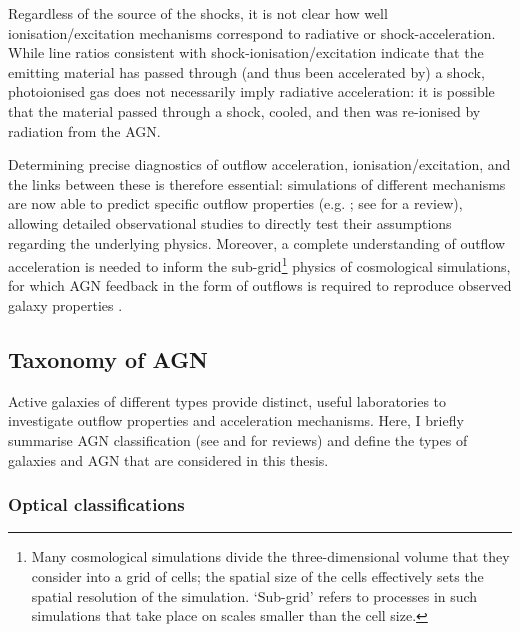 Regardless of the source of the shocks, it is not clear how well ionisation/excitation mechanisms correspond to radiative or shock-acceleration. While line ratios consistent with shock-ionisation/excitation indicate that the emitting material has passed through (and thus been accelerated by) a shock, photoionised gas does not necessarily imply radiative acceleration: it is possible that the material passed through a shock, cooled, and then was re-ionised by radiation from the AGN. 

Determining precise diagnostics of outflow acceleration, ionisation/excitation, and the links between these is therefore essential: simulations of different mechanisms are now able to predict specific outflow properties (e.g. \citealt{Richings2021, Meenakshi2022a, Meenakshi2022b}; see \citealt{Krause2023} for a review), allowing detailed observational studies to directly test their assumptions regarding the underlying physics. Moreover, a complete understanding of outflow acceleration is needed to inform the sub-grid\footnote{Many cosmological simulations divide the three-dimensional volume that they consider into a grid of cells; the spatial size of the cells effectively sets the spatial resolution of the simulation. `Sub-grid' refers to processes in such simulations that take place on scales smaller than the cell size.} physics of cosmological simulations, for which AGN feedback in the form of outflows is required to reproduce observed galaxy properties \citep{Schaye2015, Dubois2016, Dave2019, Zinger2020}.

\subsection{Taxonomy of AGN}
\label{section: introduction: outflows: taxonomy_of_agn}

Active galaxies of different types provide distinct, useful laboratories to investigate outflow properties and acceleration mechanisms. Here, I briefly summarise AGN classification (see \citealt{Netzer2015} and \citealt{Tadhunter2008, Tadhunter2016} for reviews) and define the types of galaxies and AGN that are considered in this thesis. 

\subsubsection{Optical classifications}
\label{section: introduction: outflows: taxonomy_of_agn: seyferts_and_quasars}

